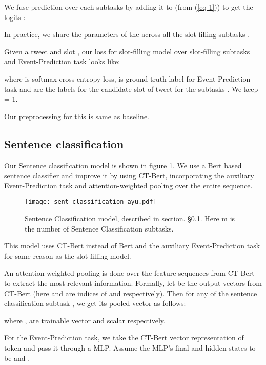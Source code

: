 \documentclass[11pt,a4paper]{article}
\begin{document}
We fuse  prediction over each subtasks  by adding it to  (from (\ref{eq-1})) to get the logits :


In practice, we share the parameters of the  across all the slot-filling subtasks .

Given a tweet  and slot , our loss for slot-filling model over  slot-filling subtasks  and Event-Prediction task looks like:






where  is softmax cross entropy loss,  is ground truth label for Event-Prediction task and  are the labels for the candidate slot  of tweet  for the subtasks . We keep  = 1.

Our preprocessing for this is same as baseline.

\subsection{Sentence classification}\label{sentence_classification_subsection}

Our Sentence classification model is shown in figure \ref{fig:model_sent_class}. We use a Bert based sentence classifier and improve it by using CT-Bert, incorporating the auxiliary Event-Prediction task and attention-weighted pooling over the entire sequence.

\begin{figure}
\centering
\texttt{[image: sent\_classification\_ayu.pdf]}
    \caption{Sentence Classification model, described in section. \S\ref{sentence_classification_subsection}. Here m is the number of Sentence Classification subtasks. }
    \label{fig:model_sent_class}
\end{figure}

This model uses CT-Bert instead of Bert and the auxiliary Event-Prediction task for same reason as the slot-filling model.
 
An attention-weighted pooling is done over the feature sequences from CT-Bert to extract the most relevant information. Formally, let  be the output vectors from CT-Bert (here  and  are indices of  and  respectively). Then for any of the sentence classification subtask , we get its pooled vector  as follows:




where ,  are trainable vector and scalar respectively.

For the Event-Prediction task, we take the CT-Bert vector representation of  token and pass it through a MLP. Assume the MLP's final and hidden states to be  and .
\end{document}
